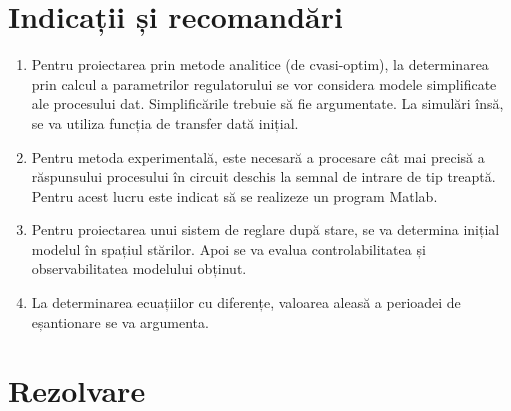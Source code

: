\documentclass[11pt]{article}
\begin{document}
\section{Indicații și recomandări}
\begin{enumerate}[label=\alph*)]
	\item Pentru proiectarea prin metode analitice (de cvasi-optim), la determinarea prin calcul a parametrilor regulatorului se vor considera modele simplificate ale procesului dat. Simplificările trebuie să fie argumentate. La simulări însă, se va utiliza funcția de transfer dată inițial.
	\item Pentru metoda experimentală, este necesară a procesare cât mai precisă a răspunsului procesului în circuit deschis la semnal de intrare de tip treaptă. Pentru acest lucru este indicat să se realizeze un program Matlab.
	\item Pentru proiectarea unui sistem de reglare după stare, se va determina inițial modelul în spațiul stărilor. Apoi se va evalua controlabilitatea și observabilitatea modelului obținut.
	\item La determinarea ecuațiilor cu diferențe, valoarea aleasă a perioadei de eșantionare se va argumenta.
\end{enumerate}
\newpage
\section{Rezolvare}
\end{document}
